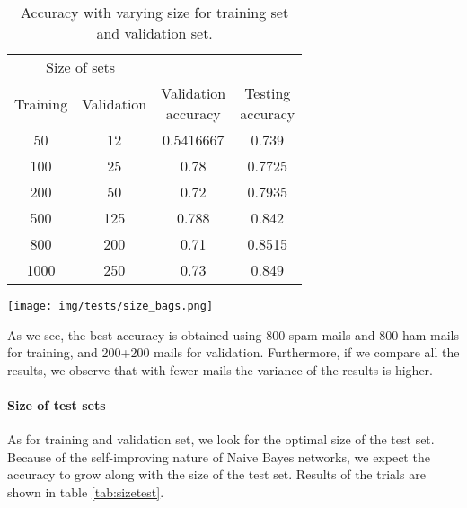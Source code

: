 \begin{center}
\begin{table}[h]
\begin{minipage}{.5\linewidth}
\begin{tabular}{cccc}
\toprule
\multicolumn{2}{c}{Size of sets} \\
\cmidrule(r){1-2}
Training & Validation & \shortstack{Validation\\ accuracy} & \shortstack{Testing\\ accuracy}\\
\midrule
50   & 12     & 0.5416667 & 0.739\\
100  & 25     & 0.78 & 0.7725 \\
200  & 50     & 0.72 & 0.7935 \\
500  & 125    & 0.788 & 0.842 \\
800  & 200    & 0.71 & 0.8515 \\
1000 & 250    & 0.73 & 0.849 \\
\bottomrule
\end{tabular}
\end{minipage}
\begin{minipage}{.5\linewidth}
\texttt{[image: img/tests/size\_bags.png]}
    \label{fig:sizebags}
\end{minipage}
\caption{Accuracy with varying size for training set and validation set.}
\label{tab:sizebags}
\end{table}
\end{center}

As we see, the best accuracy is obtained using 800 spam mails and 800 ham mails for training, and 200+200 mails for validation. Furthermore, if we compare all the results, we observe that with fewer mails the variance of the results is higher.

\paragraph{Size of test sets}
As for training and validation set, we look for the optimal size of the test set. Because of the self-improving nature of Naive Bayes networks, we expect the accuracy to grow along with the size of the test set. Results of the trials are shown in table \ref{tab:sizetest}.

